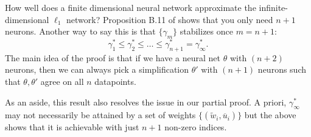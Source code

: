 \begin{remark}
How well does a finite dimensional neural network approximate the infinite-dimensional $\ell_1$ network? Proposition B.11 of \cite{wei2020regularization} shows that you only need $n+1$ neurons. Another way to say this is that $\{\gamma_m\}$ stabilizes once $m=n+1$:
\begin{equation}
\gamma_1^* \le \gamma_2^* \le \dots \le \gamma_{n+1}^* = \gamma_\infty^*.
\end{equation}
The main idea of the proof is that if we have a neural net $\theta$ with $(n+2)$ neurons, then we can always pick a simplification $\theta'$ with $(n+1)$ neurons such that $\theta,\theta'$ agree on all $n$ datapoints.

As an aside, this result also resolves the issue in our partial proof. A priori, $\gamma_{\infty}^*$ may not necessarily be attained by a set of weights $\{(\widetilde w_i, \overline u_i)\}$ but the above shows that it is achievable with just $n+1$ non-zero indices.

\end{remark}